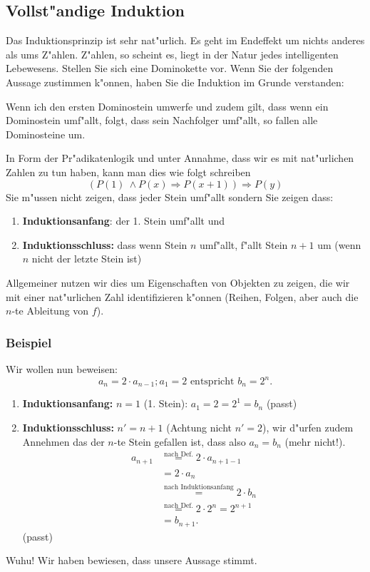 \subsection{Vollst"andige Induktion}
Das Induktionsprinzip ist sehr nat"urlich. Es geht im Endeffekt um nichts anderes als ums Z"ahlen. Z"ahlen, so scheint es, liegt in der Natur jedes intelligenten Lebewesens. Stellen Sie sich eine Dominokette vor. Wenn Sie der folgenden Aussage zustimmen k"onnen, haben Sie die Induktion im Grunde verstanden:
\begin{center}
Wenn ich den ersten Dominostein umwerfe und zudem gilt, dass wenn ein Dominostein umf"allt, folgt, dass sein Nachfolger umf"allt, so fallen alle Dominosteine um.
\end{center}
In Form der Pr"adikatenlogik und unter Annahme, dass wir es mit nat"urlichen Zahlen zu tun haben, kann man dies wie folgt schreiben
\begin{equation*}
(P(1) \ \land P(x) \Rightarrow P(x+1)) \Rightarrow P(y)
\end{equation*}
Sie m"ussen nicht zeigen, dass jeder Stein umf"allt sondern Sie zeigen dass:
\begin{enumerate}
\item \textbf{Induktionsanfang}: der 1. Stein umf"allt und
\item \textbf{Induktionsschluss:} dass wenn Stein $n$ umf"allt, f"allt Stein $n+1$ um (wenn $n$ nicht der letzte Stein ist)
\end{enumerate}
Allgemeiner nutzen wir dies um Eigenschaften von Objekten zu zeigen, die wir mit einer nat"urlichen Zahl identifizieren k"onnen (Reihen, Folgen, aber auch die $n$-te Ableitung von $f$).

\subsubsection{Beispiel}
Wir wollen nun beweisen:
\begin{equation}
a_{n} = 2 \cdot a_{n-1}; a_1 = 2 \text{ entspricht } b_n = 2^n.
\end{equation}
\begin{enumerate}
\item \textbf{Induktionsanfang:} $n = 1$ (1. Stein): $ a_1 = 2 = 2^1 = b_n$ (passt)
\item \textbf{Induktionsschluss:} $n' = n + 1$ (Achtung nicht $n' = 2$), wir d"urfen zudem Annehmen das der $n$-te Stein gefallen ist, dass also $a_n = b_n$ (mehr nicht!).
\begin{align*}
a_{n+1} &\stackrel{\text{nach Def.}}{=} 2 \cdot a_{n+1-1} \\
&=  2 \cdot a_{n} \\
&\stackrel{\text{nach Induktionsanfang}}{=} 2 \cdot b_n \\
&\stackrel{\text{nach Def.}}{=} 2 \cdot 2^n = 2^{n+1} \\
&= b_{n+1}.
\end{align*}
(passt)
\end{enumerate}
Wuhu! Wir haben bewiesen, dass unsere Aussage stimmt.

